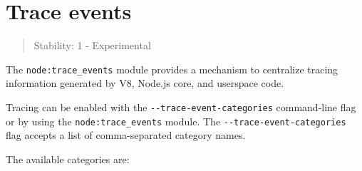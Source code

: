 \section{Trace events}\label{trace-events}

\begin{quote}
Stability: 1 - Experimental
\end{quote}

The \texttt{node:trace\_events} module provides a mechanism to
centralize tracing information generated by V8, Node.js core, and
userspace code.

Tracing can be enabled with the \texttt{-\/-trace-event-categories}
command-line flag or by using the \texttt{node:trace\_events} module.
The \texttt{-\/-trace-event-categories} flag accepts a list of
comma-separated category names.

The available categories are:

